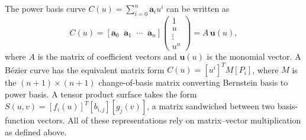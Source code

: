 \begin{remark*}
The power basis curve $C(u) = \sum_{i=0}^n \mathbf{a}_i u^i$ can be written as
\[
  C(u) = [\mathbf{a}_0 \;\; \mathbf{a}_1 \;\; \cdots \;\; \mathbf{a}_n]
  \begin{pmatrix} 1 \\ u \\ \vdots \\ u^n \end{pmatrix}
  = A \,\mathbf{u}(u),
\]
where $A$ is the matrix of coefficient vectors and $\mathbf{u}(u)$ is the monomial
vector.
A Bézier curve has the equivalent matrix form $C(u) = [u^i]^T M [P_i]$,
where $M$ is the $(n+1)\times(n+1)$ change-of-basis matrix converting
Bernstein basis to power basis.
A tensor product surface takes the form
$S(u,v) = [f_i(u)]^T [b_{i,j}] [g_j(v)]$,
a matrix sandwiched between two basis-function vectors.
All of these representations rely on matrix--vector multiplication as
defined above.
\end{remark*}
